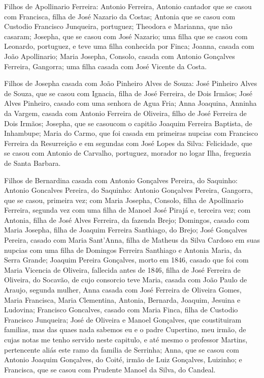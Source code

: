 Filhos de Apollinario Ferreira: Antonio Ferreira, Antonio cantador que se casou com Francisca, filha de José Nazario da Costas; Antonia que se casou com Custodio Francisco Junqueira, portuguez; Theodora e Marianna, que não casaram; Josepha, que se casou com José Nazario; uma filha que se casou com Leonardo, portuguez, e teve uma filha conhecida por Finca; Joanna, casada com João Apollinario; Maria Josepha, Consolo, casada com Antonio Gonçalves Ferreira, Gangorra; uma filha casada com José Vicente da Costa.

Filhos de Josepha casada com João Pinheiro Alves de Souza: José Pinheiro Alves de Souza, que se casou com Ignacia, filha de José
Ferreira, de Dois Irmãos; José Alves Pinheiro, casado com uma senhora de Agua Fria; Anna Joaquina, Anninha da Vargem, casada com Antonio Ferreira de Oliveira, filho de José Ferreira de Dois Irmãos; Josepha, que se casoucom o capitão Joaquim Ferreira Baptista, de Inhambupe; Maria do Carmo, que foi casada em primeiras nupcias com Francisco Ferreira da Resurreição e em segundas com José Lopes da Silva: Felicidade, que se casou com Antonio de Carvalho, portuguez, morador no logar Ilha, freguezia de Santa Barbara.

Filhos de Bernardina casada com Antonio Gonçalves Pereira, do Saquinho: Antonio Goncalves Pereira, do Saquinho: Antonio Gonçalves Pereira, Gangorra, que se casou, primeira vez; com Maria Josepha, Consolo, filha de Apollinario Ferreira, segunda vez com uma filha de Manoel José Pirajá e, terceira vez; com Antonia, filha de José Alves Ferreira, da fazenda Brejo; Domingos, casado com Maria Josepha, filha de Joaquim Ferreira Santhiago, do Brejo; José Gonçalves Pereira, casado com Maria Sant'Anna, filha de Matheus da Silva Cardoso em suas nupcias com uma filha de Domingos Ferreira Santhiago e Antonia Maria, da Serra Grande; Joaquim Pereira Gonçalves\label{jpgoncalves}, morto em 1846, casado que foi com Maria Vicencia de Oliveira, fallecida antes de 1846, filha de José Ferreira de Oliveira, do Socavão, de cujo consorcio teve Maria, casada com João Paulo de Araujo, segunda mulher, Anna casada com José Ferreira de Oliveira Gomes, Maria Francisca, Maria Clementina, Antonia, Bernarda, Joaquim, Jesuina e Ludovina; Francisco Goncalves, casado com Maria Finca, filha de Custodio Francisco Junqueira; José de Oliveira e  Manoel Gonçalves, que coustituiram familias, mas das quaes nada sabemos eu e o padre Cupertino, meu irmão, de cujas notas me tenho servido neste capitulo, e até mesmo o professor Martins, pertencente aliás este ramo da familia de Serrinha; Anna, que se casou com Antonio Joaquim Gonçalves, do Coité, irmão de Luiz Gonçalves, Luizinho; e Francisca, que se casou com Prudente Manoel da Silva, do Candeal. 

